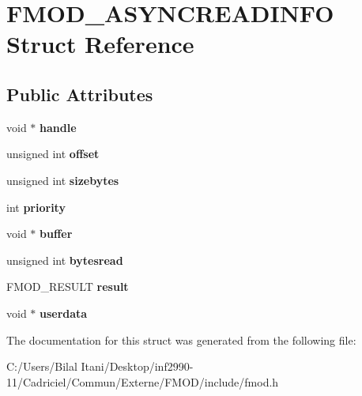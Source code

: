 \hypertarget{struct_f_m_o_d___a_s_y_n_c_r_e_a_d_i_n_f_o}{}\section{F\+M\+O\+D\+\_\+\+A\+S\+Y\+N\+C\+R\+E\+A\+D\+I\+N\+FO Struct Reference}
\label{struct_f_m_o_d___a_s_y_n_c_r_e_a_d_i_n_f_o}
\subsection*{Public Attributes}
\begin{DoxyCompactItemize}
\item 
void $\ast$ {\bfseries handle}\hypertarget{struct_f_m_o_d___a_s_y_n_c_r_e_a_d_i_n_f_o_a31e2e01864e3c97844a252f947ff8040}{}\label{struct_f_m_o_d___a_s_y_n_c_r_e_a_d_i_n_f_o_a31e2e01864e3c97844a252f947ff8040}

\item 
unsigned int {\bfseries offset}\hypertarget{struct_f_m_o_d___a_s_y_n_c_r_e_a_d_i_n_f_o_a8d42cc77cd8ef0559a666038e02a8807}{}\label{struct_f_m_o_d___a_s_y_n_c_r_e_a_d_i_n_f_o_a8d42cc77cd8ef0559a666038e02a8807}

\item 
unsigned int {\bfseries sizebytes}\hypertarget{struct_f_m_o_d___a_s_y_n_c_r_e_a_d_i_n_f_o_a19cda62a563d8b9c3116411c13d207f6}{}\label{struct_f_m_o_d___a_s_y_n_c_r_e_a_d_i_n_f_o_a19cda62a563d8b9c3116411c13d207f6}

\item 
int {\bfseries priority}\hypertarget{struct_f_m_o_d___a_s_y_n_c_r_e_a_d_i_n_f_o_aae5a4b76307bec7a0132b3abb04ab823}{}\label{struct_f_m_o_d___a_s_y_n_c_r_e_a_d_i_n_f_o_aae5a4b76307bec7a0132b3abb04ab823}

\item 
void $\ast$ {\bfseries buffer}\hypertarget{struct_f_m_o_d___a_s_y_n_c_r_e_a_d_i_n_f_o_a2154c0c4825d5f133e0b14ca1b94b324}{}\label{struct_f_m_o_d___a_s_y_n_c_r_e_a_d_i_n_f_o_a2154c0c4825d5f133e0b14ca1b94b324}

\item 
unsigned int {\bfseries bytesread}\hypertarget{struct_f_m_o_d___a_s_y_n_c_r_e_a_d_i_n_f_o_acef1543320ee49d5c723ce1dbd58e43b}{}\label{struct_f_m_o_d___a_s_y_n_c_r_e_a_d_i_n_f_o_acef1543320ee49d5c723ce1dbd58e43b}

\item 
F\+M\+O\+D\+\_\+\+R\+E\+S\+U\+LT {\bfseries result}\hypertarget{struct_f_m_o_d___a_s_y_n_c_r_e_a_d_i_n_f_o_a85e0137ab5748fbbd7ffee359823f57e}{}\label{struct_f_m_o_d___a_s_y_n_c_r_e_a_d_i_n_f_o_a85e0137ab5748fbbd7ffee359823f57e}

\item 
void $\ast$ {\bfseries userdata}\hypertarget{struct_f_m_o_d___a_s_y_n_c_r_e_a_d_i_n_f_o_a8a273751e70e26c1a51540a18269eecc}{}\label{struct_f_m_o_d___a_s_y_n_c_r_e_a_d_i_n_f_o_a8a273751e70e26c1a51540a18269eecc}

\end{DoxyCompactItemize}


The documentation for this struct was generated from the following file\+:\begin{DoxyCompactItemize}
\item 
C\+:/\+Users/\+Bilal Itani/\+Desktop/inf2990-\/11/\+Cadriciel/\+Commun/\+Externe/\+F\+M\+O\+D/include/fmod.\+h\end{DoxyCompactItemize}
